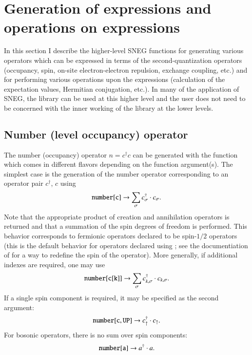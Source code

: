 \documentclass[3p,number,preprint]{elsarticle}
\begin{document}

\section{Generation of expressions and operations on expressions}
\label{sec2}

In this section I describe the higher-level SNEG functions for
generating various operators which can be expressed in terms of the
second-quantization operators (occupancy, spin, on-site
electron-electron repulsion, exchange coupling, etc.) and for
performing various operations upon the expressions (calculation of the
expectation values, Hermitian conjugation, etc.). In many of the
application of SNEG, the library can be used at this higher level and the
user does not need to be concerned with the inner working of the
library at the lower levels.


\subsection{Number (level occupancy) operator}

The number (occupancy) operator $n=c^\dag c$ can be generated with the
function  which comes in different flavors depending on
the function argument(s). The simplest case is the generation of the
number operator corresponding to an operator pair $c^\dag$, $c$ using
%
\begin{equation}
{\tt number[c]} \to \sum_\sigma c^\dag_\sigma \cdot c_\sigma.
\end{equation}
%
Note that the appropriate product of creation and annihilation
operators is returned and that a summation of the spin degrees of
freedom is performed. This behavior corresponds to fermionic operators
declared to be spin-$1/2$ operators (this is the default behavior for
operators declared using ; see the
documentiation of  for a way to redefine the
spin of the operator). More generally, if additional indexes are
required, one may use
%
\begin{equation}
{\tt number[c[k]]} \to \sum_{\sigma} c^\dag_{k,\sigma} \cdot
c_{k,\sigma}.
\end{equation}
%
If a single spin component is required, it may be specified as the
second argument:
%
\begin{equation}
{\tt number[c, UP]} \to c^\dag_\uparrow \cdot c_\uparrow.
\end{equation}
%
For bosonic operators, there is no sum over spin components:
%
\begin{equation}
{\tt number[a]} \to a^\dag \cdot a.
\end{equation}
\end{document}
